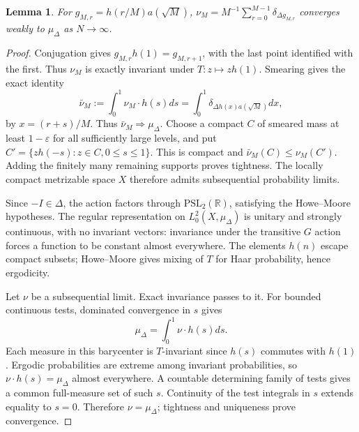 \documentclass[11pt,a4paper]{article}
\numberwithin{equation}{section}
\newtheorem{lemma}[theorem]{Lemma}
\theoremstyle{remark}
\begin{document}
\begin{lemma}\label{lem:discrete}
For $g_{M,r}=h(r/M)a(\sqrt M)$,
$\nu_M=M^{-1}\sum_{r=0}^{M-1}\delta_{\Delta g_{M,r}}$ converges weakly
to $\mu_\Delta$ as $N\to\infty$.
\end{lemma}
\begin{proof}
Conjugation gives $g_{M,r}h(1)=g_{M,r+1}$, with the last point
identified with the first. Thus $\nu_M$ is exactly invariant under
$T:z\mapsto zh(1)$. Smearing gives the exact identity
\begin{equation}\label{eq:smearing}
\bar\nu_M:=\int_0^1\nu_M\cdot h(s)ds
=\int_0^1\delta_{\Delta h(x)a(\sqrt M)}dx,
\end{equation}
by $x=(r+s)/M$. Thus $\bar\nu_M\Rightarrow\mu_\Delta$.
Choose a compact $C$ of smeared mass at least $1-\varepsilon$ for
all sufficiently large levels, and put
$C'=\{zh(-s):z\in C,0\le s\le1\}$. This is compact and
$\bar\nu_M(C)\le\nu_M(C')$. Adding the finitely many remaining
supports proves tightness. The locally compact metrizable space $X$
therefore admits subsequential probability limits.

Since $-I\in\Delta$, the action factors through
$\mathrm{PSL}_2(\mathbb R)$, satisfying the Howe--Moore hypotheses.
The regular representation on $L^2_0(X,\mu_\Delta)$ is unitary and
strongly continuous, with no invariant vectors: invariance under the
transitive $G$ action forces a function to be constant almost everywhere.
The elements $h(n)$ escape compact subsets; Howe--Moore gives mixing
of $T$ for Haar probability, hence ergodicity.

Let $\nu$ be a subsequential limit. Exact invariance passes to it.
For bounded continuous tests, dominated convergence in $s$ gives
\[
\mu_\Delta=\int_0^1\nu\cdot h(s)ds.
\]
Each measure in this barycenter is $T$-invariant since $h(s)$ commutes
with $h(1)$. Ergodic probabilities are extreme among invariant
probabilities, so $\nu\cdot h(s)=\mu_\Delta$ almost everywhere.
A countable determining family of tests gives a common full-measure
set of such $s$. Continuity of the test integrals in $s$ extends
equality to $s=0$. Therefore $\nu=\mu_\Delta$; tightness and uniqueness
prove convergence.
\end{proof}
\end{document}
